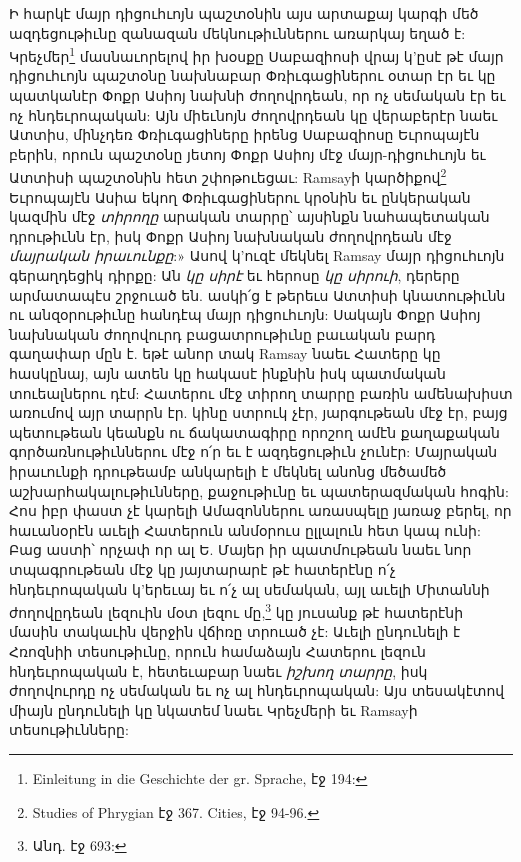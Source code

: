 \documentclass{article}
\begin{document}
{Ի հարկէ մայր դիցուհւոյն պաշտօնին այս արտաքայ կարգի մեծ ազդեցութիւնը զանազան մեկնութիւններու առարկայ եղած է: Կրեչմեր\footnote{Einleitung in die Geschichte der gr. Sprache, էջ 194:} մասնաւորելով իր խօսքը Սաբազիոսի վրայ կ'ըսէ թէ մայր դիցուհւոյն պաշտօնը նախնաբար Փռիւգացիներու օտար էր եւ կը պատկանէր Փոքր Ասիոյ նախնի ժողովրդեան, որ ոչ սեմական էր եւ ոչ հնդեւրոպական: Այն միեւնոյն ժողովրդեան կը վերաբերէր նաեւ Ատտիս, մինչդեռ Փռիւգացիները իրենց Սաբազիոսը Եւրոպայէն բերին, որուն պաշտօնը յետոյ Փոքր Ասիոյ մէջ մայր-դիցուհւոյն եւ Ատտիսի պաշտօնին հետ շփոթուեցաւ: Ramsayի կարծիքով\footnote{Studies of Phrygian էջ 367. Cities, էջ 94-96.} Եւրոպայէն Ասիա եկող Փռիւգացիներու կրօնին եւ ընկերական կազմին մէջ \emph{տիրողը} արական տարրը՝ այսինքն նահապետական դրութիւնն էր, իսկ Փոքր Ասիոյ նախնական ժողովրդեան մէջ \emph{մայրական իրաւունքը}:» Ասով կ'ուզէ մեկնել Ramsay մայր դիցուհւոյն գերաղդեցիկ դիրքը: Ան \emph{կը սիրէ} եւ հերոսը \emph{կը սիրուի}, դերերը արմատապէս շրջուած են. ասկի՛ց է թերեւս Ատտիսի կնատութիւնն ու անզօրութիւնը հանդէպ մայր դիցուհւոյն: Սակայն Փոքր Ասիոյ նախնական ժողովուրդ բացատրութիւնը բաւական բարդ գաղափար մըն է. եթէ անոր տակ Ramsay նաեւ Հատերը կը հասկընայ, այն ատեն կը հակասէ ինքնին իսկ պատմական տուեալներու դէմ: Հատերու մէջ տիրող տարրը բառին ամենախիստ առումով այր տարրն էր. կինը ստրուկ չէր, յարգութեան մէջ էր, բայց պետութեան կեանքն ու ճակատագիրը որոշող ամէն քաղաքական գործառնութիւններու մէջ ո՛ր եւ է ազդեցութիւն չունէր: Մայրական իրաւունքի դրութեամբ անկարելի է մեկնել անոնց մեծամեծ աշխարհակալութիւնները, քաջութիւնը եւ պատերազմական հոգին: Հոս իբր փաստ չէ կարելի Ամազոններու առասպելը յառաջ բերել, որ հաւանօրէն աւելի Հատերուն անմօրուս ըլլալուն հետ կապ ունի: Բաց աստի՝ որչափ որ ալ Ե. Մայեր իր պատմութեան նաեւ նոր տպագրութեան մէջ կը յայտարարէ թէ հատերէնը ո՛չ հնդեւրոպական կ'երեւայ եւ ո՛չ ալ սեմական, այլ աւելի Միտաննի ժողովըդեան լեզուին մօտ լեզու մը,\footnote{Անդ. էջ 693:} կը յուսանք թէ հատերէնի մասին տակաւին վերջին վճիռը տրուած չէ: Աւելի ընդունելի է Հռոզնիի տեսութիւնը, որուն համաձայն Հատերու լեզուն հնդեւրոպական է, հետեւաբար նաեւ \emph{իշխող տարրը}, իսկ ժողովուրդը ոչ սեմական եւ ոչ ալ հնդեւրոպական: Այս տեսակէտով միայն ընդունելի կը նկատեմ նաեւ Կրեչմերի եւ Ramsayի տեսութիւնները:

}
\end{document}
